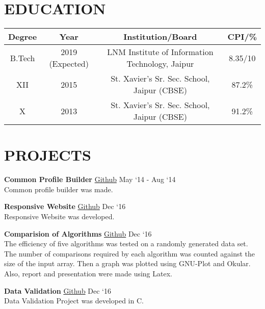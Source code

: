 \documentclass[margin]{res}
\begin{document}
\begin{resume}

\section{EDUCATION}

\begin{tabular}{|c|c|c|c|}

\hline
\textbf{Degree} & \textbf{Year} & {Institution/Board} & {CPI/\%} \\
\hline
B.Tech & 2019 (Expected) & LNM Institute of Information Technology, Jaipur & 8.35/10 \\
\hline
XII & 2015 & St. Xavier’s Sr. Sec. School, Jaipur (CBSE) & 87.2\% \\
\hline
X & 2013 & St. Xavier’s Sr. Sec. School, Jaipur (CBSE) & 91.2\% \\
\hline
\end{tabular}

\section{PROJECTS}

  {\textbf{Common Profile Builder}} \href{https://github.com/karanagarwal17/web_scrapper_nodejs}{Github} \hfill May `14 - Aug `14\\
  Common profile builder was made.

  {\textbf{Responsive Website}} \href{https://github.com/karanagarwal17/responsive-web-project}{Github} \hfill Dec `16\\
  Responsive Website was developed.

  {\textbf{Comparision of Algorithms}} \href{https://github.com/karanagarwal17/comparision-of-algorithms}{Github} \hfill Dec `16\\
  The efficiency of five algorithms was tested on a randomly generated data set. The number of comparisons required by each algorithm was counted against the size of the input array. Then a graph was plotted using GNU-Plot and Okular. Also, report and presentation were made using Latex.

  {\textbf{Data Validation}} \href{https://github.com/karanagarwal17/Data-Validation}{Github} \hfill Dec `16\\
  Data Validation Project was developed in C.



\end{resume}
\end{document}
